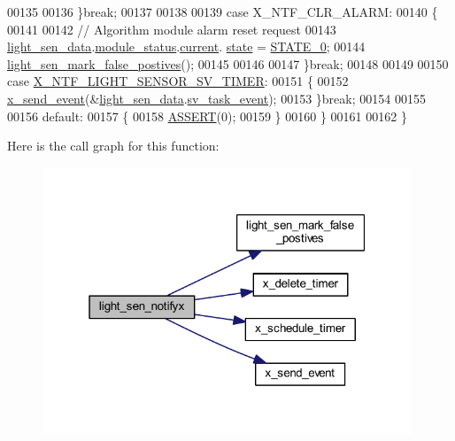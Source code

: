\begin{DoxyCode}
00135 
00136         \}\textcolor{keywordflow}{break};
00137 
00138 
00139          \textcolor{keywordflow}{case} X\_NTF\_CLR\_ALARM:
00140         \{
00141 
00142            \textcolor{comment}{// Algorithm module alarm reset request}
00143              \hyperlink{a00047_a53c98c9f84d5cecf0747bbe1f6b83696}{light\_sen\_data}.\hyperlink{a00024_a5a53c391562b059eb744ac679f3765ca}{module\_status}.\hyperlink{a00017_ab8af48cdbba92b3ae39c4470e53af944}{current}.
      \hyperlink{a00017_a6b8d8e916bc56265a3fd279bd26b6d1b}{state} = \hyperlink{a00021_ad6739dbbe5581cac99b7dc8a5e09949c}{STATE\_0};
00144              \hyperlink{a00047_acef1622ec5c40fe90bf6184813716e34}{light\_sen\_mark\_false\_postives}();
00145 
00146 
00147         \}\textcolor{keywordflow}{break};
00148 
00149         
00150         \textcolor{keywordflow}{case} \hyperlink{a00024_ad7dfa3ed8d8d926ba462f9e951f1b391}{X\_NTF\_LIGHT\_SENSOR\_SV\_TIMER}:
00151         \{
00152            \hyperlink{a00036_a4bc3d03c8d62c8237329ed4e969fbc1b}{x\_send\_event}(&\hyperlink{a00047_a53c98c9f84d5cecf0747bbe1f6b83696}{light\_sen\_data}.\hyperlink{a00024_a43c345f39ea3aefbb60ef1ef57fe5d83}{sv\_task\_event});
00153         \}\textcolor{keywordflow}{break};
00154         
00155        
00156         \textcolor{keywordflow}{default}:
00157         \{
00158             \hyperlink{a00072_abb8ff8e213ac9f6fb21d2b968583b936}{ASSERT}(0);
00159         \}
00160     \}
00161 
00162 \}
\end{DoxyCode}


Here is the call graph for this function\+:\nopagebreak
\begin{figure}[H]
\begin{center}
\leavevmode
\includegraphics[width=313pt]{d6/d2d/a00047_a317b03892739257278fd51ab8003962d_cgraph}
\end{center}
\end{figure}




